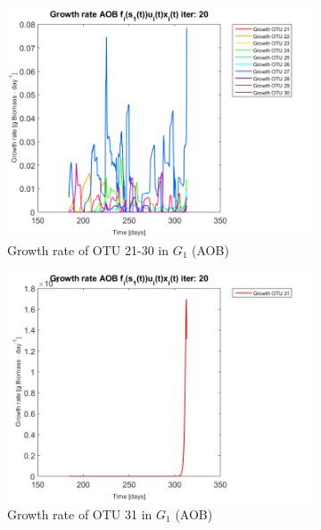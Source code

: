 \documentclass[processes,article,submit,moreauthors,pdftex]{Definitions/mdpi}
\begin{document}
\begin{figure}[h]
\begin{subfigure}{0.45 \textwidth}
		\includegraphics[width =\textwidth]{Application//200407_iter_20_growth_control_AOB_plot_3}
		\caption{Growth rate of OTU 21-30 in $G_1$ (AOB) }
	\end{subfigure}
	\begin{subfigure}{0.45 \textwidth}
		\includegraphics[width =\textwidth]{Application//200407_iter_20_growth_control_AOB_plot_4}
		\caption{Growth rate of OTU 31 in $G_1$ (AOB) }
	\end{subfigure}
	\begin{subfigure}{0.45 \textwidth}

\end{subfigure}
\end{figure}
\end{document}

